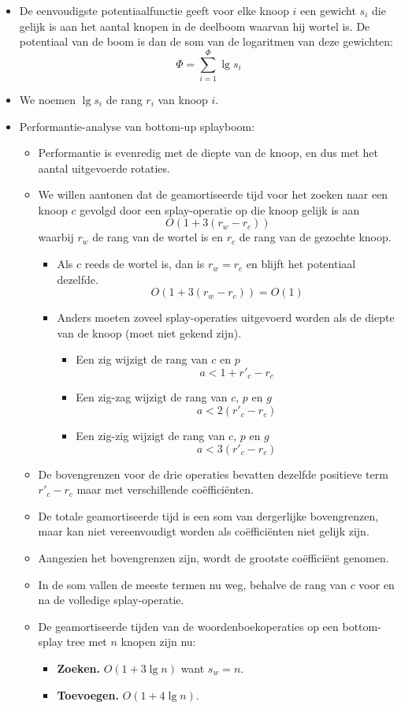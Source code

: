 \begin{itemize}
    \item De eenvoudigste potentiaalfunctie geeft voor elke knoop $i$ een gewicht $s_i$ die gelijk is aan het aantal knopen in de deelboom waarvan hij wortel is. De potentiaal van de boom is dan de som van de logaritmen van deze gewichten:
    $$\Phi = \sum_{i=1}^\Phi \lg s_i$$
    \item We noemen $\lg s_i$ de rang $r_i$ van knoop $i$.
    \item Performantie-analyse van bottom-up splayboom:
    \begin{itemize}
        \item Performantie is evenredig met de diepte van de knoop, en dus met het aantal uitgevoerde rotaties.
        \item We willen aantonen dat de geamortiseerde tijd voor het zoeken naar een knoop $c$ gevolgd door een splay-operatie op die knoop gelijk is aan $$O(1 + 3(r_w - r_c))$$
        waarbij $r_w$ de rang van de wortel is en $r_c$ de rang van de gezochte knoop.
        \begin{itemize}
            \item Als $c$ reeds de wortel is, dan is $r_w = r_c$ en blijft het potentiaal dezelfde.
            $$O(1 + 3(r_w - r_c)) = O(1)$$
            \item Anders moeten zoveel splay-operaties uitgevoerd worden als de diepte van de knoop (moet niet gekend zijn).
            \begin{itemize}
                \item Een zig wijzigt de rang van $c$ en $p$
                $$a < 1 + r'_c - r_c$$

                \item Een zig-zag wijzigt de rang van $c$, $p$ en $g$
                $$a < 2(r'_c - r_c)$$

                \item Een zig-zig wijzigt de rang van $c$, $p$ en $g$
                $$a <3(r'_c - r_c)$$ 
            \end{itemize}
        \end{itemize}
        \item De bovengrenzen voor de drie operaties bevatten dezelfde positieve term $r'_c - r_c$ maar met verschillende coëfficiënten.
        \item De totale geamortiseerde tijd is een som van dergerlijke bovengrenzen, maar kan niet vereenvoudigt worden als coëfficiënten niet gelijk zijn.
        \item Aangezien het bovengrenzen zijn, wordt de grootste coëfficiënt genomen.
        \item In de som vallen de meeste termen nu weg, behalve de rang van $c$ voor en na de volledige splay-operatie.
        \item De geamortiseerde tijden van de woordenboekoperaties op een bottom-splay tree met $n$ knopen zijn nu:
        \begin{itemize}
            \item \textbf{Zoeken.} $O(1 + 3\lg n)$ want $s_w = n$.
            \item \textbf{Toevoegen.} $O(1 + 4\lg n)$.


\end{itemize}
\end{itemize}
\end{itemize}
